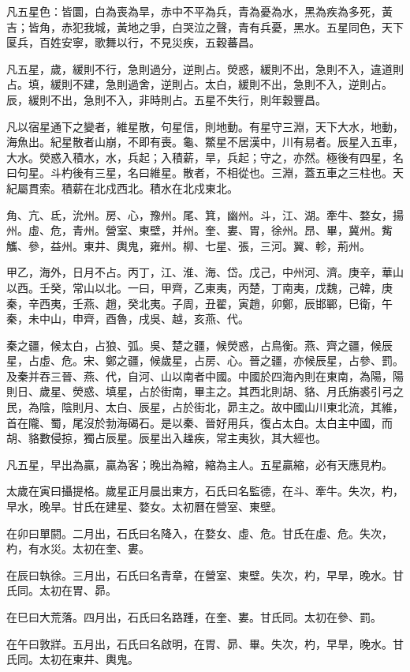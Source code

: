 \begin{pinyinscope}
凡五星色：皆圜，白為喪為旱，赤中不平為兵，青為憂為水，黑為疾為多死，黃吉；皆角，赤犯我城，黃地之爭，白哭泣之聲，青有兵憂，黑水。五星同色，天下匽兵，百姓安寧，歌舞以行，不見災疾，五穀蕃昌。

凡五星，歲，緩則不行，急則過分，逆則占。熒惑，緩則不出，急則不入，違道則占。填，緩則不建，急則過舍，逆則占。太白，緩則不出，急則不入，逆則占。辰，緩則不出，急則不入，非時則占。五星不失行，則年穀豐昌。

凡以宿星通下之變者，維星散，句星信，則地動。有星守三淵，天下大水，地動，海魚出。紀星散者山崩，不即有喪。龜、鱉星不居漢中，川有易者。辰星入五車，大水。熒惑入積水，水，兵起；入積薪，旱，兵起；守之，亦然。極後有四星，名曰句星。斗杓後有三星，名曰維星。散者，不相從也。三淵，蓋五車之三柱也。天紀屬貫索。積薪在北戍西北。積水在北戍東北。

角、亢、氐，沇州。房、心，豫州。尾、箕，幽州。斗，江、湖。牽牛、婺女，揚州。虛、危，青州。營室、東壁，并州。奎、婁、胃，徐州。昂、畢，冀州。觜觿、參，益州。東井、輿鬼，雍州。柳、七星、張，三河。翼、軫，荊州。

甲乙，海外，日月不占。丙丁，江、淮、海、岱。戊己，中州河、濟。庚辛，華山以西。壬癸，常山以北。一曰，甲齊，乙東夷，丙楚，丁南夷，戊魏，己韓，庚秦，辛西夷，壬燕、趙，癸北夷。子周，丑翟，寅趙，卯鄭，辰邯鄲，巳衛，午秦，未中山，申齊，酉魯，戌吳、越，亥燕、代。

秦之疆，候太白，占狼、弧。吳、楚之疆，候熒惑，占鳥衡。燕、齊之疆，候辰星，占虛、危。宋、鄭之疆，候歲星，占房、心。晉之疆，亦候辰星，占參、罰。及秦并吞三晉、燕、代，自河、山以南者中國。中國於四海內則在東南，為陽，陽則日、歲星、熒惑、填星，占於街南，畢主之。其西北則胡、貉、月氏旃裘引弓之民，為陰，陰則月、太白、辰星，占於街北，昴主之。故中國山川東北流，其維，首在隴、蜀，尾沒於勃海碣石。是以秦、晉好用兵，復占太白。太白主中國，而胡、貉數侵掠，獨占辰星。辰星出入趮疾，常主夷狄，其大經也。

凡五星，早出為贏，贏為客；晚出為縮，縮為主人。五星贏縮，必有天應見杓。

太歲在寅曰攝提格。歲星正月晨出東方，石氏曰名監德，在斗、牽牛。失次，杓，早水，晚旱。甘氏在建星、婺女。太初曆在營室、東壁。

在卯曰單閼。二月出，石氏曰名降入，在婺女、虛、危。甘氏在虛、危。失次，杓，有水災。太初在奎、婁。

在辰曰執徐。三月出，石氏曰名青章，在營室、東壁。失次，杓，早旱，晚水。甘氏同。太初在胃、昴。

在巳曰大荒落。四月出，石氏曰名路踵，在奎、婁。甘氏同。太初在參、罰。

在午曰敦牂。五月出，石氏曰名啟明，在胃、昴、畢。失次，杓，早旱，晚水。甘氏同。太初在東井、輿鬼。


\end{pinyinscope}
